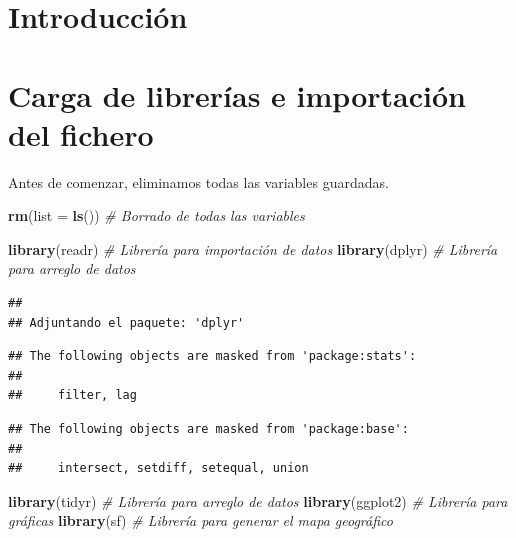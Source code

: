 \documentclass[data,article,submit,moreauthors,pdftex]{Definitions/mdpi}
\newenvironment{Shaded}{\begin{snugshade}}{\end{snugshade}}
\newcommand{\AttributeTok}[1]{\textcolor[rgb]{0.13,0.29,0.53}{#1}}
\newcommand{\CommentTok}[1]{\textcolor[rgb]{0.56,0.35,0.01}{\textit{#1}}}
\newcommand{\FunctionTok}[1]{\textcolor[rgb]{0.13,0.29,0.53}{\textbf{#1}}}
\newcommand{\NormalTok}[1]{#1}
\begin{document}

\section{Introducción}\label{introducciuxf3n}

\section{Carga de librerías e importación del
fichero}\label{carga-de-libreruxedas-e-importaciuxf3n-del-fichero}

Antes de comenzar, eliminamos todas las variables guardadas.

\begin{Shaded}
\begin{Highlighting}[]
\FunctionTok{rm}\NormalTok{(}\AttributeTok{list =} \FunctionTok{ls}\NormalTok{())  }\CommentTok{\# Borrado de todas las variables}
\end{Highlighting}
\end{Shaded}

\begin{Shaded}
\begin{Highlighting}[]
\FunctionTok{library}\NormalTok{(readr)  }\CommentTok{\# Librería para importación de datos}
\FunctionTok{library}\NormalTok{(dplyr)  }\CommentTok{\# Librería para arreglo de datos}
\end{Highlighting}
\end{Shaded}

\begin{verbatim}
## 
## Adjuntando el paquete: 'dplyr'
\end{verbatim}

\begin{verbatim}
## The following objects are masked from 'package:stats':
## 
##     filter, lag
\end{verbatim}

\begin{verbatim}
## The following objects are masked from 'package:base':
## 
##     intersect, setdiff, setequal, union
\end{verbatim}

\begin{Shaded}
\begin{Highlighting}[]
\FunctionTok{library}\NormalTok{(tidyr)  }\CommentTok{\# Librería para arreglo de datos}
\FunctionTok{library}\NormalTok{(ggplot2)  }\CommentTok{\# Librería para gráficas}
\FunctionTok{library}\NormalTok{(sf)  }\CommentTok{\# Librería para generar el mapa geográfico}
\end{Highlighting}
\end{Shaded}
\end{document}
